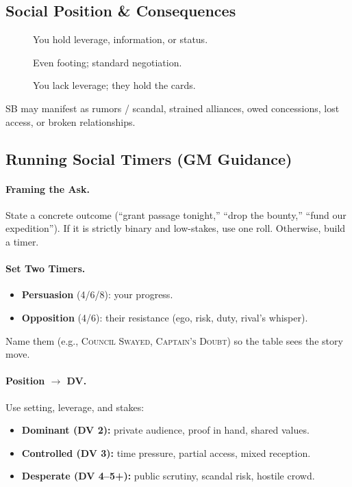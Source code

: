 \subsection{Social Position \& Consequences}\label{subsec:social_position}
\begin{description}
    \item[] You hold leverage, information, or status.
    \item[] Even footing; standard negotiation.
    \item[] You lack leverage; they hold the cards.
\end{description}
SB may manifest as rumors / scandal, strained alliances, owed concessions, lost access, or broken relationships.

\subsection{Running Social Timers (GM Guidance)}\label{subsec:social_timers}

\paragraph{Framing the Ask.}
State a concrete outcome (``grant passage tonight,'' ``drop the bounty,'' ``fund our expedition''). If it is strictly binary and low-stakes, use one roll. Otherwise, build a timer.

\paragraph{Set Two Timers.}
\begin{itemize}
    \item \textbf{Persuasion} (4/6/8): your progress.
    \item \textbf{Opposition} (4/6): their resistance (ego, risk, duty, rival's whisper).
\end{itemize}
Name them (e.g., \textsc{Council Swayed}, \textsc{Captain's Doubt}) so the table sees the story move.

\paragraph{Position $\rightarrow$ DV.}
Use setting, leverage, and stakes:
\begin{itemize}
    \item \textbf{Dominant (DV 2):} private audience, proof in hand, shared values.
    \item \textbf{Controlled (DV 3):} time pressure, partial access, mixed reception.
    \item \textbf{Desperate (DV 4--5+):} public scrutiny, scandal risk, hostile crowd.
\end{itemize}

